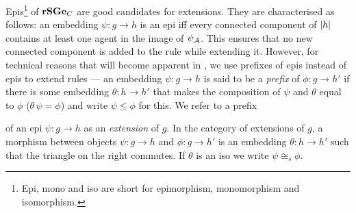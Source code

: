Epis\footnote{
  Epi, mono and iso are short for
  epimorphism, monomorphism and isomorphism.}
of $\mathbf{rSGe}_C$ are good candidates for extensions.
They are characterised as follows:
an embedding $\psi: g \to h$ is an epi iff
every connected component of $\left|h\right|$ contains
at least one agent in the image of $\psi_{\mathcal{A}}$.
This ensures that no new connected component is added to the rule
while extending it.
However, for technical reasons
that will become apparent in ,
we use prefixes of epis
instead of epis to extend rules ---
an embedding $\psi: g \to h$ is said to be
a \emph{prefix} of $\phi: g \to h'$
if there is some embedding $\theta: h \to h'$
that makes the composition of $\psi$ and $\theta$ equal to $\phi$
(\ie $\theta \, \psi = \phi$) %
and write $\psi \leq \phi$ for this.
We refer to a prefix
\begin{wrapfigure}[5]{r}{0.27\textwidth}
  \vspace{-2em}
  \begin{center}
  \end{center}
\end{wrapfigure}
of an epi $\psi: g \to h$ as an \emph{extension} of $g$.
In the category of extensions of $g$,
a morphism between objects $\psi: g \to h$ and $\phi: g \to h'$
is an embedding $\theta: h \to h'$
such that the triangle on the right commutes.
If $\theta$ is an iso we write $\psi \cong_s \phi$.

